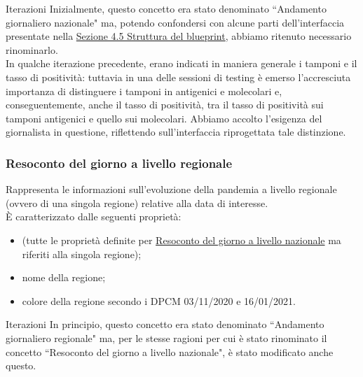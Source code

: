 \begin{bclogo}{Iterazioni}
Inizialmente, questo concetto era stato denominato ``Andamento giornaliero nazionale" ma, potendo confondersi con alcune parti dell'interfaccia presentate nella \hyperref[s:struttura-blueprint]{Sezione 4.5 Struttura del blueprint}, abbiamo ritenuto necessario rinominarlo.\\
\noindent
In qualche iterazione precedente, erano indicati in maniera generale i tamponi e il tasso di positività: tuttavia in una delle sessioni di testing è emerso l'accresciuta importanza di distinguere i tamponi in antigenici e molecolari e, conseguentemente, anche il tasso di positività, tra il tasso di positività sui tamponi antigenici e quello sui molecolari. Abbiamo accolto l'esigenza del giornalista in questione, riflettendo sull'interfaccia riprogettata tale distinzione. 

\end{bclogo}

\subsubsection{Resoconto del giorno a livello regionale}
\label{sss:resoconto-del-giorno-livello-regionale}
Rappresenta le informazioni sull'evoluzione della pandemia a livello regionale (ovvero di una singola regione) relative alla data di interesse.\\
È caratterizzato dalle seguenti proprietà:
\begin{itemize}
    \item (tutte le proprietà definite per \hyperref[sss:resoconto-del-giorno-livello-nazionale]{Resoconto del giorno a livello nazionale} ma riferiti alla singola regione);
    \item nome della regione;
    \item colore della regione secondo i DPCM 03/11/2020 e 16/01/2021.
\end{itemize}
\begin{bclogo}{Iterazioni}
In principio, questo concetto era stato denominato ``Andamento giornaliero regionale" ma, per le stesse ragioni per cui è stato rinominato il concetto ``Resoconto del giorno a livello nazionale", è stato modificato anche questo.
\end{bclogo}

